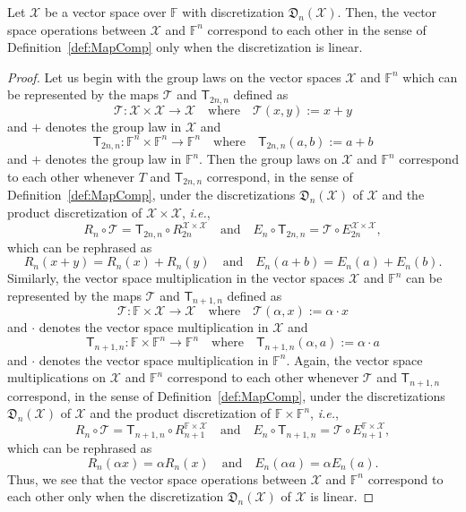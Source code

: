 \documentclass[a4paper]{paper}
\newcommand{\discr}{\mathfrak{D}}
\newcommand{\VecSpace}[1]{\mathscr{#1}}
\newcommand{\Field}{\mathbb{F}}
\newcommand{\Op}[1]{\mathcal{#1}}
\newcommand{\DiscOp}[1]{\mathsf{#1}}
\newcommand{\ie}{\textsl{i.e.}\xspace}
\begin{document}
\begin{theorem}\label{ThmVecSpaceCorr}
  Let $\VecSpace{X}$ be a vector space over $\Field$ with discretization $\discr_{n}(\VecSpace{X})$. Then,
  the vector space operations between $\VecSpace{X}$ and $\Field^{n}$ correspond
  to each other in the sense of Definition~\ref{def:MapComp} only when the discretization is linear.
\end{theorem}
\begin{proof}
Let us begin with the  group laws on the vector spaces $\VecSpace{X}$ and $\Field^{n}$ which can be 
represented by the maps $\Op{T}$ and $\DiscOp{T}_{2n,n}$ defined as  
\[ \Op{T} \colon \VecSpace{X} \times \VecSpace{X} \to \VecSpace{X} 
    \quad\text{where}\quad \Op{T}(x,y):=x+y \] 
and $+$ denotes the group law in $\VecSpace{X}$ and 
\[ \DiscOp{T}_{2n,n} \colon \Field^{n} \times \Field^{n} \to \Field^{n} 
   \quad\text{where}\quad \DiscOp{T}_{2n,n}(a,b):=a+b \] 
and $+$ denotes the group law in $\Field^{n}$. Then the group laws on $\VecSpace{X}$ and $\Field^{n}$ 
correspond to each other whenever $T$ and $\DiscOp{T}_{2n,n}$ correspond,
in the sense of Definition~\ref{def:MapComp},  under the discretizations $\discr_{n}(\VecSpace{X})$ of $\VecSpace{X}$ 
and the product discretization of $\VecSpace{X}\times \VecSpace{X}$, \ie,
\[ R_{n} \circ \Op{T} =  \DiscOp{T}_{2n,n} \circ R_{2n}^{\VecSpace{X}\times \VecSpace{X}} 
   \quad\text{and}\quad 
   E_{n}\circ \DiscOp{T}_{2n,n} = \Op{T} \circ E_{2n}^{\VecSpace{X}\times \VecSpace{X}},
\]
which can be rephrased as
\[ R_{n}(x+y) =  R_{n}(x)+R_{n}(y) 
   \quad\text{and}\quad 
   E_{n}(a+b) = E_{n}(a)+E_{n}(b).
\]
Similarly, the vector space multiplication in the vector spaces $\VecSpace{X}$ and $\Field^{n}$ 
can be represented by the maps $\Op{T}$ and $\DiscOp{T}_{n+1,n}$ defined as
\[ \Op{T} \colon \Field \times \VecSpace{X} \to \VecSpace{X} 
   \quad\text{where}\quad \Op{T}(\alpha,x):=\alpha \cdot x \] 
and $\cdot$ denotes the vector space multiplication in $\VecSpace{X}$ and 
\[ \DiscOp{T}_{n+1,n} \colon  \Field \times \Field^{n} \to \Field^{n} 
   \quad\text{where}\quad \DiscOp{T}_{n+1,n}(\alpha,a):=\alpha\cdot a  \] 
and $\cdot$ denotes the vector space multiplication in $\Field^{n}$. Again, 
the vector space multiplications on $\VecSpace{X}$ and $\Field^{n}$ 
correspond to each other whenever $\Op{T}$ and $\DiscOp{T}_{n+1,n}$ correspond,
in the sense of Definition~\ref{def:MapComp}, under the discretizations $\discr_{n}(\VecSpace{X})$ of $\VecSpace{X}$ 
and the product discretization of  $\Field \times \Field^{n}$, \ie,
\[ R_{n} \circ \Op{T} =  \DiscOp{T}_{n+1,n} \circ R_{n+1}^{\Field \times \VecSpace{X}}
   \quad\text{and}\quad 
   E_{n}\circ \DiscOp{T}_{n+1,n} =  \Op{T} \circ E_{n+1}^{\Field \times \VecSpace{X}},
\]
which can be rephrased as
\[ R_{n}(\alpha x) =  \alpha R_{n}(x) 
   \quad\text{and}\quad 
   E_{n}(\alpha a) = \alpha E_{n}(a).
\]
Thus, we see that the vector space operations between $\VecSpace{X}$ and $\Field^{n}$ correspond
to each other only when the discretization $\discr_{n}(\VecSpace{X})$ of $\VecSpace{X}$ is linear.
\end{proof}
\end{document}
